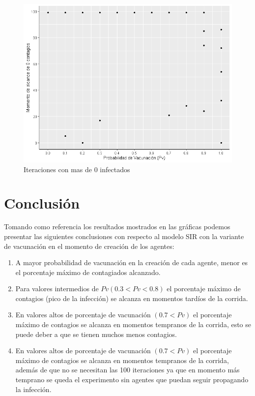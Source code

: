 \documentclass{article}
\begin{document}
\begin{figure}[h]
	\centering
	\includegraphics[width=0.6\linewidth]{Rplot3}
	\caption{Iteraciones con mas de 0 infectados}
	\label{fig:imagen3}
\end{figure}
\newpage
\section{Conclusión}
Tomando como referencia los resultados mostrados en las gráficas podemos presentar las siguientes conclusiones con respecto al modelo SIR con la variante de vacunación en el momento de creación de los agentes:
\begin{enumerate}

\item A mayor probabilidad de vacunación en la creación de cada agente, menor es el porcentaje máximo de contagiados alcanzado.
\item Para valores intermedios de $Pv (0.3 < Pv <0.8)$ el porcentaje máximo de contagios (pico de la infección) se alcanza en momentos tardíos de la corrida. 
\item En valores altos de porcentaje de vacunación $(0.7 < Pv)$ el porcentaje máximo de contagios se alcanza en momentos tempranos de la corrida, esto se puede deber a que se tienen muchos menos contagios.
\item En valores altos de porcentaje de vacunación $(0.7 < Pv)$ el porcentaje máximo de contagios se alcanza en momentos tempranos de la corrida, además de que no se necesitan las 100 iteraciones ya que en momento más temprano se queda el experimento sin agentes que puedan seguir propagando la infección.

\end{enumerate}


\end{document}
